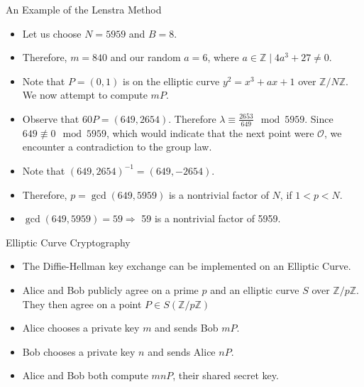 \documentclass{beamer}
\begin{document}
	\begin{frame}{An Example of the Lenstra Method}
		\begin{itemize}
			\item Let us choose $N=5959$ and $B=8$.
			\item Therefore, $m=840$ and our random $a=6$, where $a \in \mathbb{Z} \mid 4a^3+27 \neq 0$.
			\item Note that $P=(0,1)$ is on the elliptic curve $y^2=x^3+ax+1$ over $\mathbb{Z}/N\mathbb{Z}$. We now attempt to compute $mP$.
			\item Observe that $60P=(649,2654)$. Therefore $\lambda\equiv\frac{2653}{649} \mod 5959$. Since $649 \not\equiv 0 \mod 5959$, which would indicate that the next point were $\mathcal{O}$, we encounter a contradiction to the group law.
			\item Note that $(649,2654)^{-1}=(649,-2654)$.
			\item Therefore, $p=\gcd(649,5959)$ is a nontrivial factor of $N$, if $1<p<N$.
			\item $\gcd(649,5959)=59\Longrightarrow$ 59 is a nontrivial factor of 5959.
		\end{itemize}
	\end{frame}
	
	\begin{frame}{Elliptic Curve Cryptography}
		\begin{itemize}
			\item The Diffie-Hellman key exchange can be implemented on an Elliptic Curve.
			\item Alice and Bob publicly agree on a prime $p$ and an elliptic curve $S$ over $\mathbb{Z}/p\mathbb{Z}$. They then agree on a point $P \in S(\mathbb{Z}/p\mathbb{Z})$
			\item Alice chooses a private key $m$ and sends Bob $mP$.
			\item Bob chooses a private key $n$ and sends Alice $nP$.
			\item Alice and Bob both compute $mnP$, their shared secret key.
		\end{itemize}
	\end{frame}
\end{document}
